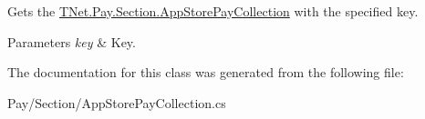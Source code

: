 Gets the \mbox{\hyperlink{class_t_net_1_1_pay_1_1_section_1_1_app_store_pay_collection}{T\+Net.\+Pay.\+Section.\+App\+Store\+Pay\+Collection}} with the specified key. 


\begin{DoxyParams}{Parameters}
{\em key} & Key.\\
\hline
\end{DoxyParams}


The documentation for this class was generated from the following file\+:\begin{DoxyCompactItemize}
\item 
Pay/\+Section/App\+Store\+Pay\+Collection.\+cs\end{DoxyCompactItemize}
